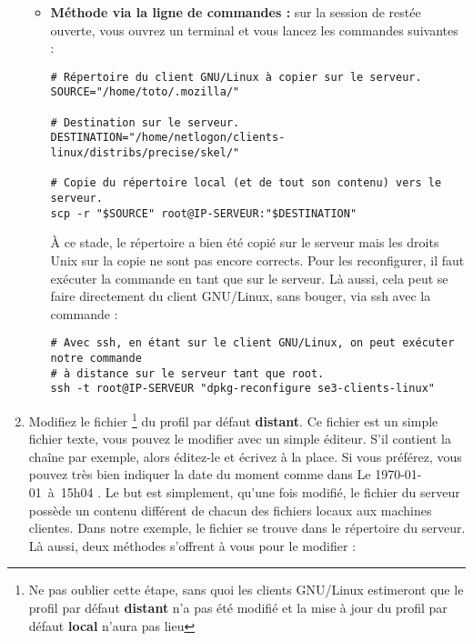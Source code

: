 \begin{enumerate}
\begin{itemize}
\item \textbf{Méthode via la ligne de commandes :}
sur la session de  restée ouverte, vous ouvrez
un terminal et vous lancez les commandes suivantes :
%
\begin{lstlisting}
# Répertoire du client GNU/Linux à copier sur le serveur.
SOURCE="/home/toto/.mozilla/"

# Destination sur le serveur.
DESTINATION="/home/netlogon/clients-linux/distribs/precise/skel/"

# Copie du répertoire local (et de tout son contenu) vers le serveur.
scp -r "$SOURCE" root@IP-SERVEUR:"$DESTINATION"
\end{lstlisting}
%
À ce stade, le répertoire  a bien été
copié sur le serveur mais les droits Unix sur la copie ne sont pas encore corrects.
Pour les reconfigurer, il faut exécuter la commande
\og {} \fg{} en tant que
 sur le serveur. Là aussi, cela peut se faire
directement du client GNU/Linux, sans bouger, via ssh avec la commande :
%
\begin{lstlisting}
# Avec ssh, en étant sur le client GNU/Linux, on peut exécuter notre commande
# à distance sur le serveur tant que root.
ssh -t root@IP-SERVEUR "dpkg-reconfigure se3-clients-linux"
\end{lstlisting}

\end{itemize}


\item Modifiez le fichier
%
\footnote{Ne pas oublier cette étape, sans quoi les clients GNU/Linux 
estimeront que le profil par défaut \textbf{distant}
n'a pas été modifié et la mise à jour du profil
par défaut \textbf{local} n'aura pas lieu}
du profil par défaut \textbf{distant}. 
Ce fichier  est un simple fichier texte, vous pouvez le modifier
avec un simple éditeur. S'il contient la chaîne  \fg{} par exemple, alors
éditez-le et écrivez  \fg{} à la place. Si vous préférez, vous 
pouvez très bien indiquer la date du moment comme dans \og Le \today~à~15h04 \fg{}.
Le but est simplement, qu'une fois modifié, le fichier  du
serveur possède un contenu différent de chacun des fichiers 
locaux aux machines clientes.
Dans notre exemple, le fichier 
se trouve dans le répertoire 
 du serveur.
Là aussi, deux méthodes s'offrent à vous pour le modifier :


\end{enumerate}
